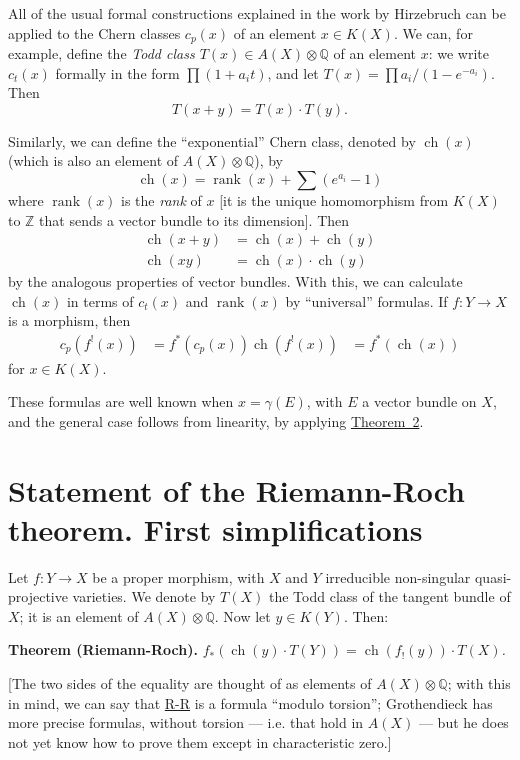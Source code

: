 \documentclass{article}
\newenvironment{itenv}[1]
  {\phantomsection\par\medskip\noindent\textbf{#1.}\itshape}
  {\par\medskip}
\DeclareMathOperator{\ch}{ch}
\DeclareMathOperator{\rank}{rank}
\newcommand{\oldpage}[1]{\marginpar{\footnotesize$\Big\vert$ \textit{p.~#1}}}
\begin{document}
All of the usual formal constructions explained in the work by Hirzebruch \cite{9} can be applied to the Chern classes $c_p(x)$ of an element $x\in K(X)$.
We can, for example, define the \emph{Todd class $T(x)\in A(X)\otimes\mathbb{Q}$} of an element $x$:
we write $c_t(x)$ formally in the form $\prod(1+a_it)$, and let $T(x)=\prod a_i/(1-e^{-a_i})$.
Then
\[
  T(x+y) = T(x)\cdot T(y).
\]

Similarly, we can define the ``exponential'' Chern class, denoted by $\ch(x)$ (which is also an element of $A(X)\otimes\mathbb{Q}$), by
\[
  \ch(x) = \rank(x)+\sum(e^{a_i}-1)
\]
where $\rank(x)$ is the \emph{rank} of $x$ [it is the unique homomorphism from $K(X)$ to $\mathbb{Z}$ that sends a vector bundle to its dimension].
Then
\[
  \begin{aligned}
    \ch(x+y) &= \ch(x)+\ch(y)
  \\\ch(xy) &= \ch(x)\cdot\ch(y)
  \end{aligned}
\]
by the analogous properties of vector bundles.
With this, we can calculate $\ch(x)$ in terms of $c_t(x)$ and $\rank(x)$ by ``universal'' formulas.
If $f\colon Y\to X$ is a morphism, then
\[
  \begin{aligned}
    c_p(f^!(x)) &= f^*(c_p(x))
    \ch(f^!(x)) &= f^*(\ch(x))
  \end{aligned}
\]
for $x\in K(X)$.

These formulas are well known when $x=\gamma(E)$, with $E$ a vector bundle on $X$, and the general case follows from linearity, by applying \hyperref[theorem2]{Theorem~2}.


\section{Statement of the Riemann-Roch theorem. First simplifications}
\label{section7}

\oldpage{113}
Let $f\colon Y\to X$ be a proper morphism, with $X$ and $Y$ irreducible non-singular quasi-projective varieties.
We denote by $T(X)$ the Todd class of the tangent bundle of $X$;
it is an element of $A(X)\otimes\mathbb{Q}$.
Now let $y\in K(Y)$.
Then:

\begin{itenv}{Theorem (Riemann-Roch)}
\label{theoremriemannroch}
  $f_*(\ch(y)\cdot T(Y)) = \ch(f_!(y))\cdot T(X)$.
\end{itenv}

[The two sides of the equality are thought of as elements of $A(X)\otimes\mathbb{Q}$;
with this in mind, we can say that \hyperref[theoremriemannroch]{R-R} is a formula ``modulo torsion'';
Grothendieck has more precise formulas, without torsion --- i.e. that hold in $A(X)$ --- but he does not yet know how to prove them except in characteristic zero.]
\end{document}
